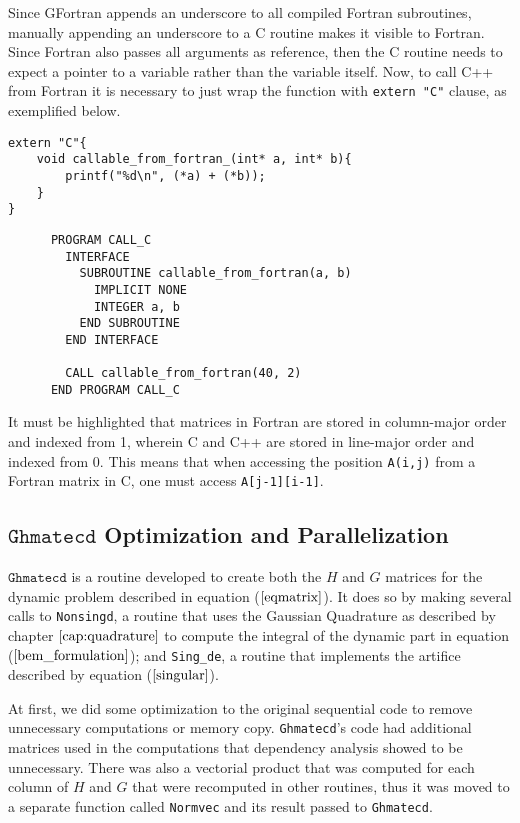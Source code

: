 Since GFortran appends an underscore to all compiled Fortran subroutines, manually appending an 
underscore to a C routine makes it visible to Fortran. Since Fortran also passes all arguments 
as reference, then the C routine needs to expect a pointer to a variable rather than the variable 
itself. Now, to call C++ from Fortran it is necessary to just wrap the function with \texttt{extern "C"}
clause, as exemplified below.

\begin{minipage}{\textwidth}
\lstset{language=C}
\begin{lstlisting}
extern "C"{
	void callable_from_fortran_(int* a, int* b){
		printf("%d\n", (*a) + (*b));
	}
}
\end{lstlisting}
\lstset{language=Fortran}
\begin{lstlisting}
      PROGRAM CALL_C
        INTERFACE
          SUBROUTINE callable_from_fortran(a, b)
            IMPLICIT NONE
            INTEGER a, b
          END SUBROUTINE
        END INTERFACE

        CALL callable_from_fortran(40, 2)
      END PROGRAM CALL_C
\end{lstlisting}
\end{minipage}
It must be highlighted that matrices in Fortran are stored in column-major order and indexed from 1, 
wherein C and C++ are stored in line-major order and indexed from 0. This means that when accessing 
the position \texttt{A(i,j)} from a Fortran matrix in C, one must access \texttt{A[j-1][i-1]}.

\subsection{$\texttt{Ghmatecd}$ Optimization and Parallelization}

$\texttt{Ghmatecd}$ is a routine developed to create both the $H$ and $G$ matrices for the dynamic problem 
described in equation ($\ref{eqmatrix}$). It does so by making several calls to \texttt{Nonsingd}, a routine
that uses the Gaussian Quadrature as described by chapter $\ref{cap:quadrature}$ to compute the integral of the 
dynamic part in equation ($\ref{bem_formulation}$); and \texttt{Sing\_de}, a routine 
that implements the artifice described by equation ($\ref{singular}$).

At first, we did some optimization to the original sequential code to remove unnecessary computations or memory copy.
\texttt{Ghmatecd}'s code had additional matrices used in the computations that dependency analysis showed to be unnecessary. 
There was also a vectorial product that was computed for each column of $H$ and $G$ that were recomputed in other 
routines, thus it was moved to a separate function called \texttt{Normvec} and its result passed to \texttt{Ghmatecd}.

